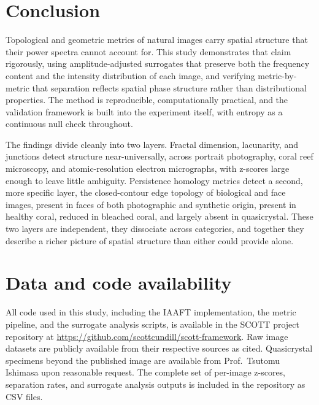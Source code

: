 \documentclass[a4paper,12pt]{article}
\begin{document}
\section{Conclusion}

Topological and geometric metrics of natural images carry spatial structure that their power spectra cannot account for. This study demonstrates that claim rigorously, using amplitude-adjusted surrogates that preserve both the frequency content and the intensity distribution of each image, and verifying metric-by-metric that separation reflects spatial phase structure rather than distributional properties. The method is reproducible, computationally practical, and the validation framework is built into the experiment itself, with entropy as a continuous null check throughout.

The findings divide cleanly into two layers. Fractal dimension, lacunarity, and junctions detect structure near-universally, across portrait photography, coral reef microscopy, and atomic-resolution electron micrographs, with z-scores large enough to leave little ambiguity. Persistence homology metrics detect a second, more specific layer, the closed-contour edge topology of biological and face images, present in faces of both photographic and synthetic origin, present in healthy coral, reduced in bleached coral, and largely absent in quasicrystal. These two layers are independent, they dissociate across categories, and together they describe a richer picture of spatial structure than either could provide alone.


\section*{Data and code availability}
All code used in this study, including the IAAFT implementation, the metric pipeline, and the surrogate analysis scripts, is available in the SCOTT project repository at \url{https://github.com/scottcundill/scott-framework}. Raw image datasets are publicly available from their respective sources as cited. Quasicrystal specimens beyond the published image are available from Prof.\ Tsutomu Ishimasa upon reasonable request. The complete set of per-image z-scores, separation rates, and surrogate analysis outputs is included in the repository as CSV files.
\end{document}
